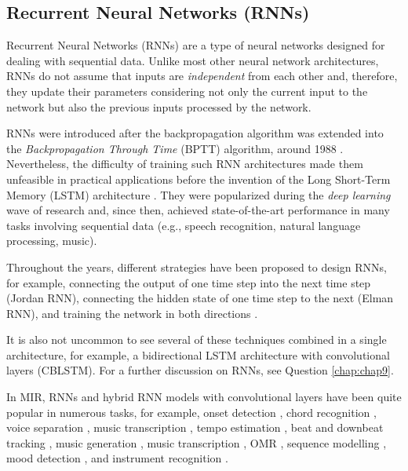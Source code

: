 \subsection{Recurrent Neural Networks (RNNs)}
Recurrent Neural Networks (RNNs) are a type of neural networks designed for dealing with sequential data. Unlike most other neural network architectures, RNNs do not assume that inputs are \emph{independent} from each other and, therefore, they update their parameters considering not only the current input to the network but also the previous inputs processed by the network.

RNNs were introduced after the backpropagation algorithm \cite{rumelhart_learning_1988} was extended into the \emph{Backpropagation Through Time} (BPTT) algorithm, around 1988 \cite{werbos_generalization_1988, werbos_backpropagation_1990}. Nevertheless, the difficulty of training such RNN architectures made them unfeasible in practical applications before the invention of the Long Short-Term Memory (LSTM) architecture \cite{hochreiter_long_1997}. They were popularized during the \emph{deep learning} wave of research and, since then, achieved state-of-the-art performance in many tasks involving sequential data (e.g., speech recognition, natural language processing, music).

Throughout the years, different strategies have been proposed to design RNNs, for example, connecting the output of one time step into the next time step (Jordan RNN), connecting the hidden state of one time step to the next (Elman RNN), and training the network in both directions \cite{schuster_bidirectional_1997}.

It is also not uncommon to see several of these techniques combined in a single architecture, for example, a bidirectional LSTM architecture with convolutional layers (CBLSTM). For a further discussion on RNNs, see Question \ref{chap:chap9}.

In MIR, RNNs and hybrid RNN models with convolutional layers have been quite popular in numerous tasks, for example, onset detection \cite{eyben_universal_2010}, chord recognition \cite{boulanger-lewandowski_audio_2013, sigtia_end--end_2016, sears_evaluating_2018}, voice separation \cite{huang_singing-voice_2014}, music transcription \cite{sigtia_rnn-based_2014}, tempo estimation \cite{bock_accurate_2015}, beat and downbeat tracking \cite{bock_joint_2016, krebs_downbeat_2016}, music generation \cite{liu_predicting_2016, liang_automatic_2017, lim_chord_2017}, music transcription \cite{rigaud_singing_2016, sigtia_end--end_2016, southall_automatic_2016, vogl_recurrent_2016, southall_automatic_2017, vogl_drum_2017, basaran_main_2018}, OMR \cite{calvo-zaragoza_one-step_2017, wel_optical_2017, calvo-zaragoza_camera-primus:_2018}, sequence modelling \cite{ycart_study_2017}, mood detection \cite{delbouys_music_2018}, and instrument recognition \cite{gururani_instrument_2018}.


